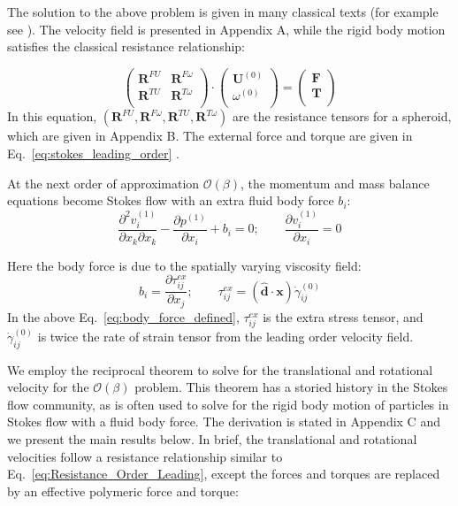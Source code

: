 \documentclass{jfm}
\begin{document}
The solution to the above problem is given in many classical texts (for example see \citep{KimKarilla2005}).  The velocity field is presented in Appendix A, while the rigid body motion satisfies the classical resistance relationship:

\begin{equation}
\label{eq:Resistance_Order_Leading}
\left(\begin{array}{cc}
\boldsymbol{R}^{FU} & \boldsymbol{R}^{F\omega}   \\
\boldsymbol{R}^{TU} & \boldsymbol{R}^{T\omega} \\
\end{array}\right) \cdot \left(\begin{array}{c}
\boldsymbol{U}^{(0)} \\
\omega^{(0)} \\
\end{array}\right)=\left(\begin{array}{c}
\boldsymbol{F} \\
\boldsymbol{T} \\
\end{array}\right)
\end{equation}
In this equation, $(\boldsymbol{R}^{FU},\boldsymbol{R}^{F\omega},\boldsymbol{R}^{TU},\boldsymbol{R}^{T\omega})$ are the resistance tensors for a spheroid, which are given in Appendix B. The external force and torque are given in Eq.~\eqref{eq:stokes_leading_order} .

At the next order of approximation $\mathcal{O}(\beta)$, the momentum and mass balance equations become Stokes flow with an extra fluid body force $b_i$:
\begin{equation}
    \frac{\partial ^2v_i^{(1)}}{\partial x_k\partial x_k} -\frac{\partial p^{(1)}}{\partial x_i} +b_i =0 ;\qquad \frac{\partial v_i^{(1)}}{\partial x_i} =0
\end{equation}

Here the body force is due to the spatially varying viscosity field:
\begin{equation}
\label{eq:body_force_defined}
    b_i =\frac{\partial\tau_{ij}^{ex}}{\partial x_j}; \qquad \tau_{ij}^{ex} = (\boldsymbol{\hat{d}} \cdot \boldsymbol{x})\dot{\gamma}_{ij}^{(0)}
\end{equation}
In the above Eq.~\eqref{eq:body_force_defined}, $\tau_{ij}^{ex}$ is the extra stress tensor, and $\dot{\gamma}^{(0)}_{ij}$ is twice the rate of strain tensor from the leading order velocity field.

We employ the reciprocal theorem to solve for the translational and rotational velocity for the $\mathcal{O}(\beta)$ problem.  This theorem has a storied history in the Stokes flow community, as is often used to solve for the rigid body motion of particles in Stokes flow with a fluid body force.  The derivation is stated in Appendix C and we present the main results below.  In brief, the translational and rotational velocities follow a resistance relationship similar to Eq.~\eqref{eq:Resistance_Order_Leading}, except the forces and torques are replaced by an effective polymeric force and torque:
\end{document}
